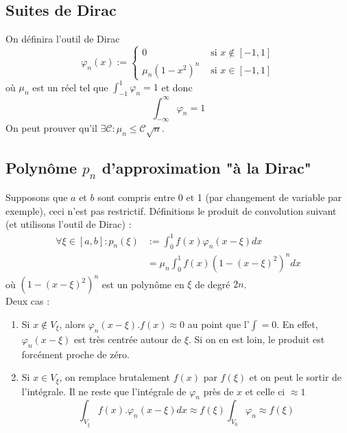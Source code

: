 \subsection{Suites de Dirac}
On définira l'outil de Dirac 
\begin{equation}
	\varphi_n(x) := \left\{\begin{array}{ll}
	0 & \text{ si } x \notin [-1,1]\\
	\mu_n(1-x^2)^n & \text{ si } x \in [-1,1]	
	\end{array}\right.
\end{equation}
où $\mu_n$ est un réel tel que $\int_{-1}^1 \varphi_n = 1$ et donc 
\begin{equation}
	\int_{-\infty}^\infty \varphi_n = 1
\end{equation}
On peut prouver qu'il $\exists\mathcal{C} : \mu_n \leq \mathcal{C}\sqrt{n}$.\\
	
	
\subsection{Polynôme $p_n$ d'approximation "à la Dirac"}
Supposons que $a$ et $b$ sont compris entre 0 et 1 (par changement de variable 
par exemple), ceci n'est pas restrictif. Définitions le produit de convolution 
suivant (et utilisons l'outil de Dirac) :
\begin{equation}
	\begin{array}{ll}
		\forall \xi \in [a,b] : p_n(\xi) & := \int_0^1 f(x)\varphi_n(x-\xi)dx    \\
		                                 & = \mu_n\int_0^1 f(x)(1-(x-\xi)^2)^ndx 
	\end{array}
\end{equation}
où $(1-(x-\xi)^2)^n$ est un polynôme en $\xi$ de degré $2n$.\\
Deux cas :
\begin{enumerate}
	\item Si $x \notin V_\xi$, alors $\varphi_n(x-\xi).f(x) \approx 0$ au point 
	      que l'$\int = 0$. En effet, $\varphi_n(x-\xi)$ est très centrée autour de 
	      $\xi$. Si on en est loin, le produit est forcément proche de zéro.
	\item Si $x \in V_\xi$, on remplace brutalement $f(x)$ par $f(\xi)$ et on peut 
	      le sortir de l'intégrale. Il ne reste que l'intégrale de $\varphi_n$ près de $x$ 
	      et celle ci $\approx 1$
	      \begin{equation}
	      	\int_{V_\xi} f(x).\varphi_n(x-\xi)dx \approx f(\xi)\int_{V_0}\varphi_n \approx 
	      	f(\xi)
	      \end{equation}
\end{enumerate}
	
